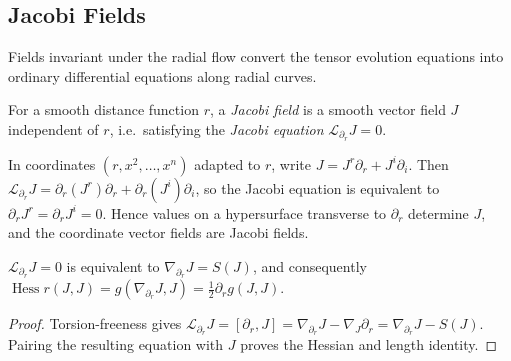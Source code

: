 \subsection{Jacobi Fields}

Fields invariant under the radial flow convert the tensor evolution equations
into ordinary differential equations along radial curves.

\begin{definition}
  \label{def:pet-ch3-jacobi-field}


  For a smooth distance function $r$, a \emph{Jacobi field} is a smooth vector
  field $J$ independent of $r$, i.e.\ satisfying the \emph{Jacobi equation}
  $\mathcal L_{\partial_r}J=0$.
\end{definition}

\begin{remark}
  \label{rem:pet-ch3-jacobi-field-construction}


  \sketch
  In coordinates $(r,x^2,\dots,x^n)$ adapted to $r$, write
  $J=J^r\partial_r+J^i\partial_i$. Then
  $\mathcal L_{\partial_r}J=\partial_r(J^r)\partial_r+\partial_r(J^i)\partial_i$, so the Jacobi
  equation is equivalent to $\partial_rJ^r=\partial_rJ^i=0$. Hence values on a
  hypersurface transverse to $\partial_r$ determine $J$, and the coordinate
  vector fields are Jacobi fields.
\end{remark}

\begin{lemma}
  \label{lem:pet-ch3-jacobi-field-equivalent-equation}


  $\mathcal L_{\partial_r}J=0$ is equivalent to $\nabla_{\partial_r}J=S(J)$, and
  consequently $\operatorname{Hess}r(J,J)=g(\nabla_{\partial_r}J,J)=\tfrac12\partial_rg(J,J)$.
\end{lemma}
\begin{proof}

  \sketch
  Torsion-freeness gives
  $\mathcal L_{\partial_r}J=[\partial_r,J]
  =\nabla_{\partial_r}J-\nabla_J\partial_r
  =\nabla_{\partial_r}J-S(J)$.
  Pairing the resulting equation with $J$ proves the Hessian and length identity.
\end{proof}


